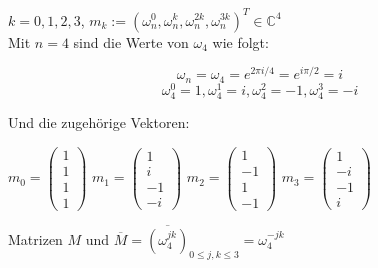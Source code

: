 \documentclass[12pt]{scrartcl}
\begin{document}

\begin{enumAlph}

    \item $k=0,1,2,3$,  $m_k:=(\omega_n^0,\omega_n^k,\omega_n^{2k},\omega_n^{3k})^T \in \mathbb{C}
    ^4$\\
    
    Mit $n=4$ sind die Werte von $\omega_4$ wie folgt:

    \[\omega_n = \omega_4 = e^{2\pi i/4}=e^{i\pi /2}=i\]
    \[\omega_4^{0}=1, \omega_4^{1}=i,\omega_4^{2}=-1,\omega_4^{3}=-i\]

    Und die zugehörige Vektoren:\\
    
    \vspace{0.1cm}
\begin{center}%
    $\mathit{m_0} = \begin{pmatrix} 1 \\ 1 \\ 1 \\ 1 \end{pmatrix}$%
    $\mathit{m_1} = \begin{pmatrix} 1 \\ i \\ -1 \\ -i \end{pmatrix}$%
    $\mathit{m_2} = \begin{pmatrix} 1 \\ -1 \\ 1 \\ -1 \end{pmatrix}$%
    $\mathit{m_3} = \begin{pmatrix} 1 \\ -i \\ -1 \\ i \end{pmatrix}$%
\end{center}

   \item Matrizen $M$ und $\overline{M}=\overline{(\omega_4^{jk})}_{0\leq j,k\leq 3}=\omega_4^{-jk}$\\

   \vspace{0.2cm}


\end{enumAlph}
\end{document}
